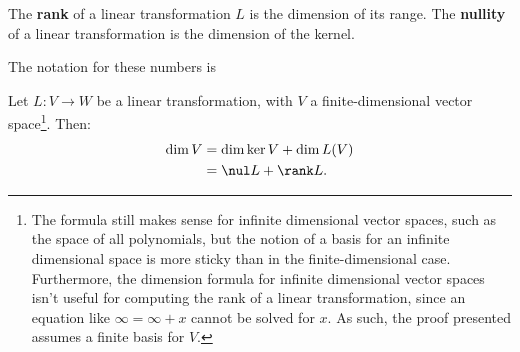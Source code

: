 \begin{definition}
The {\bfseries rank} of a linear transformation $L$ is the dimension of its range.
The {\bfseries nullity} of a linear transformation is the dimension of the kernel.
\end{definition}
The notation for these numbers is 

\begin{theorem}\label{dimension_formula}
Let $L \colon V\rightarrow W$ be a linear transformation, with $V$ a finite-dimensional vector space\footnote{The formula still makes sense for infinite dimensional vector spaces, such as the space of all polynomials, but the notion of a basis for an infinite dimensional space is more sticky than in the finite-dimensional case.  Furthermore, the dimension formula for infinite dimensional vector spaces isn't useful for computing the rank of a linear transformation, since an equation like $\infty=\infty+x$ cannot be solved for $x$. As such, the proof presented assumes a finite basis for $V$.}.  Then:
\begin{align*}
\dim V &= \dim \ker V + \dim L(V)\\
 &= \nul L + \rank L.
\end{align*}
\end{theorem}



